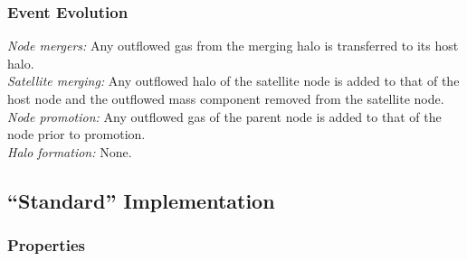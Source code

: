 \subsubsection{Event Evolution}

\noindent\emph{Node mergers:} Any outflowed gas from the merging halo is transferred to its host halo.\\

\noindent\emph{Satellite merging:} Any outflowed halo of the satellite \gls{node} is added to that of the host \gls{node} and the outflowed mass \gls{component} removed from the satellite node.\\

\noindent\emph{Node promotion:} Any outflowed gas of the parent \gls{node} is added to that of the \gls{node} prior to promotion.\\

\noindent\emph{Halo formation:} None.\\

\subsection{``Standard'' Implementation}

\subsubsection{Properties}

